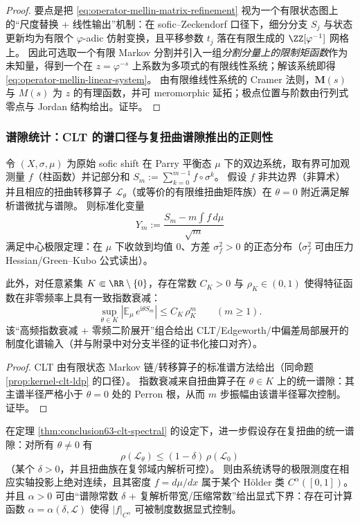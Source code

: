 \begin{proof}
要点是把 \eqref{eq:operator-mellin-matrix-refinement} 视为一个有限状态图上的“尺度替换 + 线性输出”机制：在 sofic--Zeckendorf 口径下，细分分支 \(S_j\) 与状态更新均为有限个 \(\varphi\)-adic 仿射变换，且平移参数 \(t_j\) 落在有限生成的 \(\ZZ[\varphi^{-1}]\) 网格上。
因此可选取一个有限 Markov 分割并引入一组\emph{分割分量上的限制矩函数}作为未知量，得到一个在 \(z=\varphi^{-s}\) 上系数为多项式的有限线性系统；解该系统即得 \eqref{eq:operator-mellin-linear-system}。
由有限维线性系统的 Cramer 法则，\(\mathbf{M}(s)\) 与 \(M(s)\) 为 \(z\) 的有理函数，并可 meromorphic 延拓；极点位置与阶数由行列式零点与 Jordan 结构给出。证毕。
\end{proof}

\subsubsection{谱隙统计：CLT 的谱口径与复扭曲谱隙推出的正则性}

\begin{theorem}\label{thm:conclusion63-clt-spectral}
令 \((X,\sigma,\mu)\) 为原始 sofic shift 在 Parry 平衡态 \(\mu\) 下的双边系统，取有界可加观测量 \(f\)（柱函数）并记部分和
\(
S_m:=\sum_{k=0}^{m-1}f\circ\sigma^{k}
\)。
假设 \(f\) 非共边界（非算术）并且相应的扭曲转移算子 \(\mathcal{L}_{\theta}\)（或等价的有限维扭曲矩阵族）在 \(\theta=0\) 附近满足解析谱微扰与谱隙。
则标准化变量
\[
Y_m:=\frac{S_m-m\int f\,d\mu}{\sqrt{m}}
\]
满足中心极限定理：在 \(\mu\) 下收敛到均值 \(0\)、方差 \(\sigma_f^2>0\) 的正态分布（\(\sigma_f^2\) 可由压力 Hessian/Green--Kubo 公式读出）。
\par
此外，对任意紧集 \(K\Subset \RR\setminus\{0\}\)，存在常数 \(C_K>0\) 与 \(\rho_K\in(0,1)\) 使得特征函数在非零频率上具有一致指数衰减：
\[
\boxed{\;
\sup_{\theta\in K}\left|\mathbb{E}_{\mu}\,e^{\mathrm{i}\theta S_m}\right|
\le C_K\,\rho_K^{m}\qquad(m\ge 1).\;}
\]
该“高频指数衰减 + 零频二阶展开”组合给出 CLT/Edgeworth/中偏差局部展开的制度化谱输入（并与附录中对分支半径的证书化接口对齐）。
\end{theorem}

\begin{proof}
CLT 由有限状态 Markov 链/转移算子的标准谱方法给出（同命题 \ref{prop:kernel-clt-ldp} 的口径）。
指数衰减来自扭曲算子在 \(\theta\in K\) 上的统一谱隙：其主谱半径严格小于 \(\theta=0\) 处的 Perron 根，从而 \(m\) 步振幅由该谱半径幂次控制。证毕。
\end{proof}

\begin{corollary}[复扭曲统一谱隙 \texorpdfstring{$\Rightarrow$}{=>} 极限密度的 Hölder 正则]\label{cor:conclusion64-holder-regularity}
在定理 \ref{thm:conclusion63-clt-spectral} 的设定下，进一步假设存在复扭曲的统一谱隙：对所有 \(\theta\neq 0\) 有
\[
\rho(\mathcal{L}_{\theta})\le (1-\delta)\,\rho(\mathcal{L}_0)
\]
（某个 \(\delta>0\)，并且扭曲族在复邻域内解析可控）。
则由系统诱导的极限测度在相应实轴投影上绝对连续，且其密度 \(f=d\mu/dx\) 属于某个 Hölder 类 \(C^{\alpha}([0,1])\)。
并且 \(\alpha>0\) 可由“谱隙常数 \(\delta\) + 复解析带宽/压缩常数”给出显式下界：存在可计算函数 \(\alpha=\alpha(\delta,\mathcal{L})\) 使得 \(|f|_{C^{\alpha}}\) 可被制度数据显式控制。
\end{corollary}

